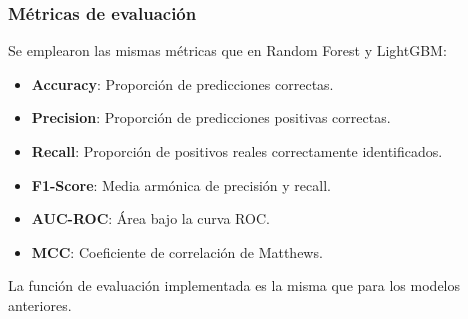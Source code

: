 \subsubsection*{Métricas de evaluación}

Se emplearon las mismas métricas que en Random Forest y LightGBM:

\begin{itemize}
    \item \textbf{Accuracy}: Proporción de predicciones correctas.
    \item \textbf{Precision}: Proporción de predicciones positivas correctas.
    \item \textbf{Recall}: Proporción de positivos reales correctamente identificados.
    \item \textbf{F1-Score}: Media armónica de precisión y recall.
    \item \textbf{AUC-ROC}: Área bajo la curva ROC.
    \item \textbf{MCC}: Coeficiente de correlación de Matthews.
\end{itemize}

La función de evaluación implementada es la misma que para los modelos anteriores.